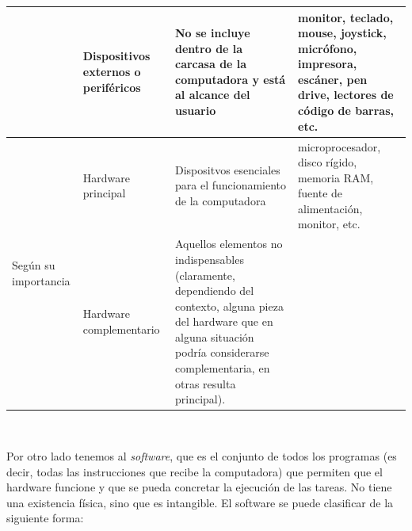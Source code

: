\documentclass[
]{book}
\begin{document}
\begin{table}[H]
\begin{tabular}{ p{3.5cm} p{2.5cm} p{6cm}p{4cm}}
                                      & Dispositivos externos o periféricos & No se incluye dentro de la carcasa de la computadora y está al alcance del usuario                                                                                                             & monitor, teclado, mouse, joystick, micrófono, impresora, escáner, pen drive, lectores de código de barras, etc. \\ \midrule
\multirow{2}{*}{Según su importancia} & Hardware principal                  & Dispositvos esenciales para el funcionamiento de la computadora                                                                                                                                & microprocesador, disco rígido, memoria RAM, fuente de alimentación, monitor, etc.                               \\ \cmidrule(l){2-4} 
                                      & Hardware complementario             & Aquellos elementos no indispensables (claramente, dependiendo del contexto, alguna pieza del hardware que en alguna situación podría considerarse complementaria, en otras resulta principal). &                                                                                                                 \\ \bottomrule
\end{tabular}
\end{table}

\(~\)

Por otro lado tenemos al \emph{software}, que es el conjunto de todos los programas (es decir, todas las instrucciones que recibe la computadora) que permiten que el hardware funcione y que se pueda concretar la ejecución de las tareas. No tiene una existencia física, sino que es intangible. El software se puede clasificar de la siguiente forma:
\end{document}

